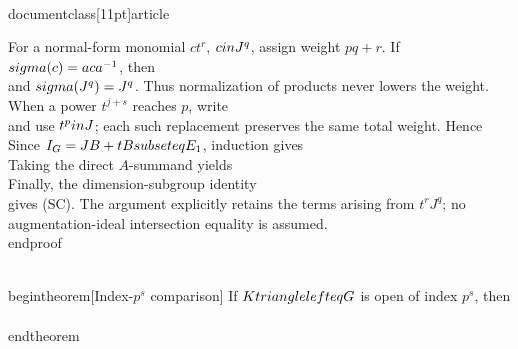 \\documentclass[11pt]{article}
\begin{document}
For a normal-form monomial $ct^r$, $c\\in J^q$, assign weight $pq+r$. If
$\\sigma(c)=aca^{-1}$, then
\\[
tc=\\sigma(c)t+(\\sigma(c)-c),
\\]
and $\\sigma(J^q)=J^q$. Thus normalization of products never lowers the weight. When a power $t^{j+s}$ reaches $p$, write
\\[
t^{j+s}=(t^p)^u t^v,
\\qquad j+s=up+v,\quad 0\\le v<p,
\\]
and use $t^p\\in J$; each such replacement preserves the same total weight. Hence
\\[
E_mE_\\ell\\subseteq E_{m+\\ell}.
\\tag{NF}
\\]
Since $I_G=JB+tB\\subseteq E_1$, induction gives
\\[
I_G^n\\subseteq E_n.
\\]
Taking the direct $A$-summand yields
\\[
I_G^n\\cap A\\subseteq J^{\\lceil n/p\\rceil}.
\\]
Finally, the dimension-subgroup identity
\\[
D_n(H)=H\\cap(1+I_H^n)
\\]
gives (SC). The argument explicitly retains the terms arising from $t^rJ^q$; no augmentation-ideal intersection equality is assumed.
\\end{proof}

\\begin{theorem}[Index-$p^s$ comparison]
If $K\\trianglelefteq G$ is open of index $p^s$, then
\\[
\\boxed{D_n(G)\\cap K\\subseteq D_{\\lceil n/p^s\\rceil}(K).}
\\tag{SC_s}
\\]
\\end{theorem}
\end{document}
